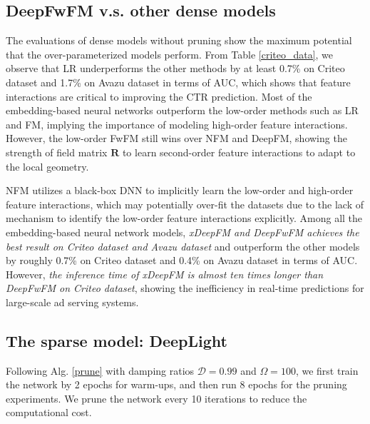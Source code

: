 \documentclass[sigconf]{acmart}
\begin{document}
\subsection{DeepFwFM v.s. other dense models}
\label{dense_model}

The evaluations of dense models without pruning show the maximum potential that the over-parameterized models perform. From Table \ref{criteo_data}, we observe that LR underperforms the other methods by at least 0.7\% on Criteo dataset and 1.7\% on Avazu dataset in terms of AUC, which shows that feature interactions are critical to improving the CTR prediction. Most of the embedding-based neural networks outperform the low-order methods such as LR and FM, implying the importance of modeling high-order feature interactions. However, the low-order FwFM still wins over NFM and DeepFM, showing the strength of field matrix $\bm{R}$ to learn second-order feature interactions to adapt to the local geometry. 

NFM utilizes a black-box DNN to implicitly learn the low-order and high-order feature interactions, which may potentially over-fit the datasets due to the lack of mechanism to identify the low-order feature interactions explicitly. Among all the embedding-based neural network models, \emph{xDeepFM and DeepFwFM achieves the best result on Criteo dataset and Avazu dataset} and outperform the other models by roughly 0.7\% on Criteo dataset and 0.4\% on Avazu dataset in terms of AUC. However, \emph{the inference time of xDeepFM is almost ten times longer than DeepFwFM on Criteo dataset}, showing the inefficiency in real-time predictions for large-scale ad serving systems. 




\subsection{The sparse model: DeepLight}
\label{prune_exp}



Following Alg. \ref{prune} with damping ratios $\mathcal{D}=0.99$ and $\Omega=100$, we first train the network by 2 epochs for warm-ups, and then run 8 epochs for the pruning experiments. We prune the network every 10 iterations to reduce the computational cost. 
\end{document}
